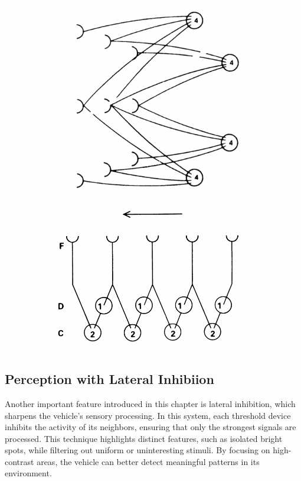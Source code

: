 \documentclass{article}
\begin{document}
	\begin{figure}
		\centering
		\begin{minipage}{.5\textwidth}
		  \centering
		  \includegraphics[width=.7\linewidth]{images/figure_12.png}
		\end{minipage}%
		\qquad
		\begin{minipage}{.5\textwidth}
		  \centering
		  \includegraphics[width=.7\linewidth]{images/figure_13.png}
		\end{minipage}
	\end{figure}

	\subsection*{Perception with Lateral Inhibiion}
	
	Another important feature introduced in this chapter is lateral inhibition, which sharpens the vehicle's sensory processing. In this system, each threshold device inhibits the activity of its neighbors, ensuring that only the strongest signals are processed. This technique highlights distinct features, such as isolated bright spots, while filtering out uniform or uninteresting stimuli. By focusing on high-contrast areas, the vehicle can better detect meaningful patterns in its environment.
\end{document}
